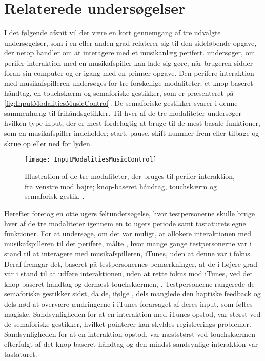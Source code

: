 \section{Relaterede undersøgelser}
\label{RelateretUndersoegelser}
%
I det følgende afsnit vil der være en kort gennemgang af tre udvalgte undersøgelser, som i en eller anden grad relaterer sig til den sideløbende opgave, der netop handler om at interagere med et musikanlæg perifert. \blankline
%
\textcite{PDF:ComparingInputModalities} undersøger, om perifer interaktion med en musikafspiller kan lade sig gøre, når brugeren sidder foran sin computer og er igang med en primær opgave. Den perifere interaktion med musikafspilleren undersøges for tre forskellige modaliteter; et knop-baseret håndtag, en touchskærm og semaforiske gestikker, som er præsenteret på \autoref{fig:InputModalitiesMusicControl}. De semaforiske gestikker svarer i denne sammenhæng til frihåndsgetikker. Til hver af de tre modaliteter undersøger \textcite[ss. 165-166]{PDF:ComparingInputModalities} hvilken type input, der er mest fordelagtig at bruge til de mest basale funktioner, som en musikafspiller indeholder; start, pause, skift nummer frem eller tilbage og skrue op eller ned for lyden.  
%
\begin{figure}[H]
	\centering
	\texttt{[image: InputModalitiesMusicControl]}
	\caption{Illustration af de tre modaliteter, der bruges til perifer interaktion, fra venstre mod højre; knop-baseret håndtag, touchskærm og semaforisk gestik, \parencite[s. 163]{PDF:ComparingInputModalities}.}
	\label{fig:InputModalitiesMusicControl}
\end{figure}
\noindent
%
Herefter foretog \textcite[ss. 169-174]{PDF:ComparingInputModalities} en otte ugers feltundersøgelse, hvor testpersonerne skulle bruge hver af de tre modaliteter igennem en to ugers periode samt tastaturets egne funktioner. For at undersøge, om det var muligt, at allokere interaktionen med musikafspilleren til det perifere, målte \textcite[ss. 172-173]{PDF:ComparingInputModalities}, hvor mange gange testpersonerne var i stand til at interagere med musikafspilleren, iTunes, uden at denne var i fokus. Deraf fremgår det, baseret på testpersonernes bemærkninger, at de i højere grad var i stand til at udføre interaktionen, uden at rette fokus mod iTunes, ved det knop-baseret håndtag og dernæst touchskærmen, \parencite[ss. 172]{PDF:ComparingInputModalities}. Testpersonerne rangerede de semaforiske gestikker sidst, da de, ifølge \textcite[ss. 172-173]{PDF:ComparingInputModalities}, dels manglede den haptiske feedback og dels nød at overvære ændringerne i iTunes forårsaget af deres input, som føltes magiske. Sandsynligheden for at en interaktion med iTunes opstod, var størst ved de semaforiske gestikker, hvilket \textcite[s. 171]{PDF:ComparingInputModalities} pointerer kan skyldes registrerings problemer. Sandsynligheden for at en interaktion opstod, var næststørst ved touchskærmen efterfulgt af det knop-baseret håndtag og den mindst sandsynlige interaktion var tastaturet. 

